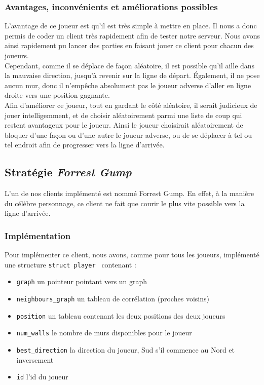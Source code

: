 \documentclass[11pt]{article}
\begin{document}
\subsubsection{Avantages, inconvénients et améliorations possibles}

L'avantage de ce joueur est qu'il est très simple à mettre en place. Il nous a donc permis de coder un client très rapidement afin de tester notre serveur. Nous avons ainsi rapidement pu lancer des parties en faisant jouer ce client pour chacun des joueurs. \\

Cependant, comme il se déplace de façon aléatoire, il est possible qu'il aille dans la mauvaise direction, jusqu'à revenir sur la ligne de départ. Également, il ne pose aucun mur, donc il n'empêche absolument pas le joueur adverse d'aller en ligne droite vers une position gagnante. \\

Afin d'améliorer ce joueur, tout en gardant le côté aléatoire, il serait judicieux de jouer intelligemment, et de choisir aléatoirement parmi une liste de coup qui restent avantageux pour le joueur. Ainsi le joueur choisirait aléatoirement de bloquer d'une façon ou d'une autre le joueur adverse, ou de se déplacer à tel ou tel endroit afin de progresser vers la ligne d'arrivée.

\subsection{Stratégie \textit{Forrest Gump}}
\label{sec:ForrestGump}

L'un de nos clients implémenté est nommé Forrest Gump. En effet, à la manière du célèbre personnage, ce client ne fait que courir le plus vite possible vers la ligne d'arrivée.

\subsubsection{Implémentation}

Pour implémenter ce client, nous avons, comme pour tous les joueurs, implémenté une structure \texttt{struct player } contenant :
\begin{itemize}
    \item \texttt{graph} un pointeur pointant vers un graph
    \item \texttt{neighbours\_graph} un tableau de corrélation (proches voisins)
    \item \texttt{position} un tableau contenant les deux positions des deux joueurs
    \item \texttt{num\_walls} le nombre de murs disponibles pour le joueur
    \item \texttt{best\_direction} la direction du joueur, Sud s'il commence au Nord et inversement
    \item \texttt{id} l'id du joueur
\end{itemize}
\end{document}
